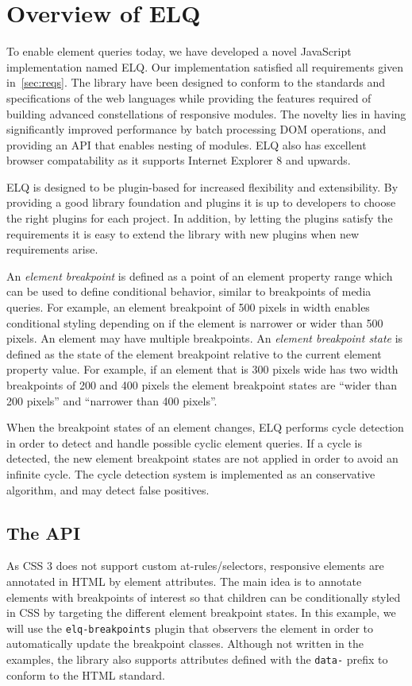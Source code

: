 \documentclass{acm_proc_article-sp}
\newcommand{\code}[1]{\texttt{#1}}
\newcommand{\elq}{ELQ}
\begin{document}
\section{Overview of \elq{}}
  To enable element queries today, we have developed a novel JavaScript implementation named \elq{}.
  Our implementation satisfied all requirements given in~\ref{sec:reqs}.
  The library have been designed to conform to the standards and specifications of the web languages while providing the features required of building advanced constellations of responsive modules.
  The novelty lies in having significantly improved performance by batch processing DOM operations, and providing an API that enables nesting of modules.
  \elq{} also has excellent browser compatability as it supports Internet Explorer 8 and upwards.

  \elq{} is designed to be plugin-based for increased flexibility and extensibility.
  By providing a good library foundation and plugins it is up to developers to choose the right plugins for each project.
  In addition, by letting the plugins satisfy the requirements it is easy to extend the library with new plugins when new requirements arise.

  An \emph{element breakpoint} is defined as a point of an element property range which can be used to define conditional behavior, similar to breakpoints of media queries.
  For example, an element breakpoint of 500 pixels in width enables conditional styling depending on if the element is narrower or wider than 500 pixels.
  An element may have multiple breakpoints.
  An \emph{element breakpoint state} is defined as the state of the element breakpoint relative to the current element property value.
  For example, if an element that is 300 pixels wide has two width breakpoints of 200 and 400 pixels the element breakpoint states are ``wider than 200 pixels'' and ``narrower than 400 pixels''.

  When the breakpoint states of an element changes, \elq{} performs cycle detection in order to detect and handle possible cyclic element queries.
  If a cycle is detected, the new element breakpoint states are not applied in order to avoid an infinite cycle.
  The cycle detection system is implemented as an conservative algorithm, and may detect false positives.

  \subsection{The API}\label{sec:elq-api}
    As CSS 3 does not support custom at-rules/selectors, responsive elements are annotated in HTML by element attributes.
    The main idea is to annotate elements with breakpoints of interest so that children can be conditionally styled in CSS by targeting the different element breakpoint states.
    In this example, we will use the \code{elq-breakpoints} plugin that observers the element in order to automatically update the breakpoint classes.
    Although not written in the examples, the library also supports attributes defined with the \code{data-} prefix to conform to the HTML standard.
\end{document}
